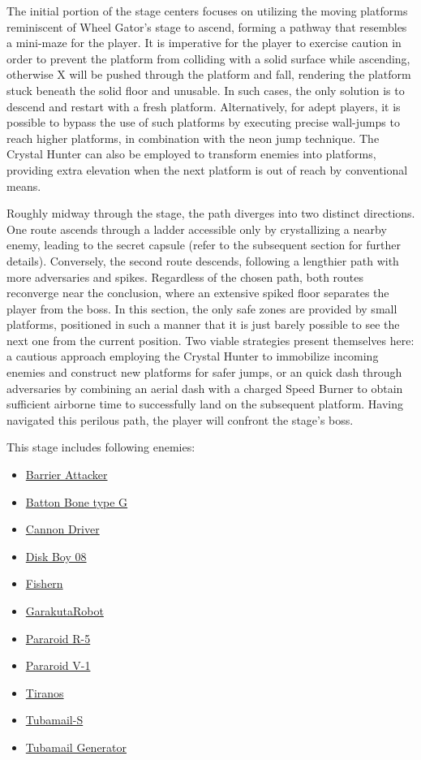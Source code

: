 The initial portion of the stage centers focuses on utilizing the moving platforms reminiscent of Wheel Gator's stage to ascend, forming a pathway that resembles a mini-maze for the player. It is imperative for the player to exercise caution in order to prevent the platform from colliding with a solid surface while ascending, otherwise X will be pushed through the platform and fall, rendering the platform stuck beneath the solid floor and  unusable. In such cases, the only solution is to descend and restart with a fresh platform. Alternatively, for adept players, it is possible to bypass the use of such platforms by executing precise wall-jumps to reach higher platforms, in combination with the neon jump technique. The Crystal Hunter can also be employed to transform enemies into platforms, providing extra elevation when the next platform is out of reach by conventional means.

Roughly midway through the stage, the path diverges into two distinct directions. One route ascends through a ladder accessible only by crystallizing a nearby enemy, leading to the secret capsule (refer to the subsequent section for further details). Conversely, the second route descends, following a lengthier path with more adversaries and spikes. Regardless of the chosen path, both routes reconverge near the conclusion, where an extensive spiked floor separates the player from the boss. In this section, the only safe zones are provided by small platforms, positioned in such a manner that it is just barely possible to see the next one from the current position. Two viable strategies present themselves here: a cautious approach employing the Crystal Hunter to immobilize incoming enemies and construct new platforms for safer jumps, or an quick dash through adversaries by combining an aerial dash with a charged Speed Burner to obtain sufficient airborne time to successfully land on the subsequent platform. Having navigated this perilous path, the player will confront the stage's boss.

This stage includes following enemies:
\begin{itemize}
	\item \hyperlink{enem:Barrier_Attacker}{Barrier Attacker}
	\item \hyperlink{enem:Batton_Bone_type_G}{Batton Bone type G}
	\item \hyperlink{enem:Cannon_Driver}{Cannon Driver}
	\item \hyperlink{enem:Disk_Boy_08}{Disk Boy 08}
	\item \hyperlink{enem:Fishern}{Fishern}
	\item \hyperlink{enem:Garakuta_Robot}{GarakutaRobot}
	\item \hyperlink{enem:Pararoid_R-5}{Pararoid R-5}
	\item \hyperlink{enem:Pararoid_V-1}{Pararoid V-1}
	\item \hyperlink{enem:Tiranos}{Tiranos}
	\item \hyperlink{enem:Tubamail-S}{Tubamail-S}
	\item \hyperlink{enem:Tubamail_Generator}{Tubamail Generator}
\end{itemize}



